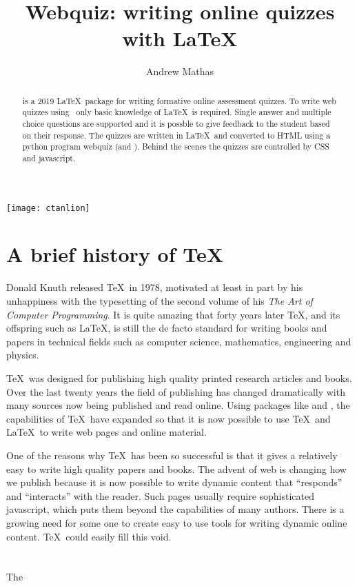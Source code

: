 \documentclass{ltugboat}
\author{Andrew Mathas}
\title{Webquiz: writing online quizzes with \LaTeX}
\begin{document}
\maketitle
\texttt{[image: ctanlion]}

\begin{abstract}
 \WebQuiz is a 2019 \LaTeX\ package for writing formative online
 assessment quizzes. To write web quizzes using \WbeQuiz\ only basic
 knowledge of \LaTeX\ is required. Single answer and multiple choice
 questions are supported and it is possble to give feedback to the
 student based on their response.  The quizzes are written in \LaTeX\
 and converted to HTML using a python program \textsf{webquiz} (and
 \ctan*{tex4ht}). Behind the scenes the quizzes are controlled by
 CSS and javascript.
\end{abstract}

\section{A brief history of \TeX}
Donald Knuth released \TeX\ in 1978, motivated at least in part by his
unhappiness with the typesetting of the second volume of his \textit{The
Art of Computer Programming}. It is quite amazing that forty years later
\TeX, and its offspring such as \LaTeX, is still the de facto standard
for writing books and papers in technical fields such as computer
science, mathematics, engineering and physics.

\TeX\ was designed for publishing high quality printed research articles
and books.  Over the last twenty years the field of publishing has
changed dramatically with many sources now being published and read
online.  Using packages like \ctan{TeX4ht} and \ctan{lwarp}, the capabilities of
\TeX\ have expanded so that it is now possible to use \TeX\ and \LaTeX\
to write web pages and online material.

One of the reasons why \TeX\ has been so successful is that it gives a
relatively easy to write high quality papers and books. The advent of
web is changing how we publish because it is now possible to write
dynamic content that ``responds'' and ``interacts'' with the reader.
Such pages usually require sophisticated javascript, which puts them
beyond the capabilities of many authors. There is a growing need for
some one to create easy to use tools for writing dynamic online content.
\TeX\ could easily fill this void.

\section{\WebQuiz}
The \WebQuiz
\end{document}
